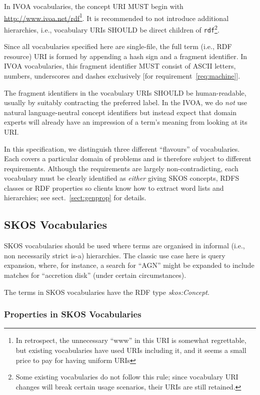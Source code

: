 \documentclass[11pt,a4paper]{ivoa}
\newcommand{\vocterm}[1]{\emph{\color{termcolor}#1}}
\begin{document}
In IVOA vocabularies, the concept URI MUST begin with
\url{http://www.ivoa.net/rdf}\footnote{In retrospect, the unnecessary
``www'' in this URI is somewhat regrettable, but existing vocabularies
have used URIs including it, and it seems a small price to pay for
having uniform URIs}.  It is recommended to not introduce
additional hierarchies, i.e., vocabulary URIs SHOULD be direct children
of \texttt{rdf}\footnote{Some existing vocabularies do not follow this
rule; since vocabulary URI changes will break certain usage scenarios,
their URIs are still retained.}.

Since all vocabularies specified here are
single-file, the full term (i.e., RDF resource) 
URI is formed by appending a hash sign
and a fragment identifier.  In IVOA vocabularies, this fragment
identifier MUST consist of ASCII letters, numbers, underscores and
dashes exclusively [for requirement~\ref{req:machine}].

The fragment identifiers in the vocabulary URIs SHOULD be
human-readable, usually by suitably contracting the
preferred label.  In the IVOA, we do \emph{not} use natural
language-neutral concept identifiers but instead expect that domain
experts will already have an impression of a term's meaning from looking
at its URI.

In this specification, we distinguish three different ``flavours'' of
vocabularies.  Each covers a particular domain of problems and is
therefore subject to different requirements.
Although the requirements are largely non-contradicting, each vocabulary must
be clearly identified as \emph{either} giving SKOS concepts, RDFS
classes or RDF properties so clients know how to extract word lists and
hierarchies; see sect.~\ref{sect:genprop}
for details.


\subsection{SKOS Vocabularies}
\label{sect:skosvoc}

SKOS vocabularies should be used where terms are organised 
in informal (i.e., non necessarily strict is-a)
hierarchies.  The classic use case here is query expansion, where, for
instance, a search for ``AGN'' might be expanded to include matches for
``accretion disk'' (under certain circumstances).

The terms in SKOS vocabularies have the RDF type \vocterm{skos:Concept}.

\subsubsection{Properties in SKOS Vocabularies}
\label{sect:skosvoc-prop}
\end{document}
